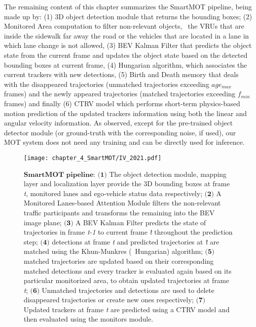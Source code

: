 The remaining content of this chapter summarizes the SmartMOT pipeline, being made up by: (1) 3D object detection module that returns the bounding boxes; (2) Monitored Area computation to filter non-relevant objects, \eg \ the VRUs that are inside the sidewalk far away the road or the vehicles that are located in a lane in which lane change is not allowed, (3) BEV Kalman Filter that predicts the object state from the current frame and updates the object state based on the detected bounding boxes at current frame, (4) Hungarian algorithm, which associates the current trackers with new detections, (5) Birth and Death memory that deals with the disappeared trajectories (unmatched trajectories exceeding ${age_{max}}$ frames) and the newly appeared trajectories (matched trajectories exceeding ${f_{min}}$ frames) and finally (6) \ac{CTRV} model which performs short-term physics-based motion prediction of the updated trackers information using both the linear and angular velocity information. As observed, except for the pre-trained object detector module (or ground-truth with the corresponding noise, if used), our \ac{MOT} system does not need any training and can be directly used for inference.

\begin{figure}[h]
	\centering
	\texttt{[image: chapter\_4\_SmartMOT/IV\_2021.pdf]}
	\caption[SmartMOT pipeline]{$\textbf{SmartMOT pipeline}$: $\textbf{(1)}$ The object detection module, mapping layer and localization layer provide the 3D bounding boxes at frame \textit{t}, monitored lanes and ego-vehicle status data respectively; $\textbf{(2)}$ A Monitored Lanes-based Attention Module filters the non-relevant traffic participants and transforms the remaining into the \ac{BEV} image plane; $\textbf{(3)}$ A \ac{BEV} Kalman Filter predicts the state of trajectories in frame \textit{t-1} to current frame \textit{\^{t}} throughout the prediction step; $\textbf{(4)}$ detections at frame \textit{t} and predicted trajectories at \textit{\^{t}} are matched using the Khun-Munkres (\aka \ Hungarian) algorithm; $\textbf{(5)}$ matched trajectories are updated based on their corresponding matched detections and every tracker is evaluated again based on its particular monitorized area, to obtain updated trajectories at frame \textit{{t}}; $\textbf{(6)}$ Unmatched trajectories and detections are used to delete disappeared trajectories or create new ones respectively; $\textbf{(7)}$ Updated trackers at frame \textit{{t}} are predicted using a CTRV model and then evaluated using the monitors module.}
	\label{fig:chapter_4_SmartMOT/IV_2021}
\end{figure}


